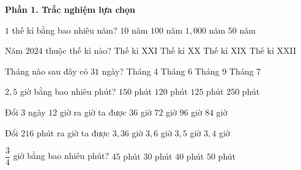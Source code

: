 \textbf{Phần 1. Trắc nghiệm lựa chọn}

\begin{ex} %
$1$ thế kỉ bằng bao nhiêu năm?
\choice
{$10$ năm}
{\True $100$ năm}
{$1,000$ năm}
{$50$ năm}
\end{ex}

\begin{ex} %
Năm $2024$ thuộc thế kỉ nào?
\choice
{\True Thế kỉ XXI}
{Thế kỉ XX}
{Thế kỉ XIX}
{Thế kỉ XXII}
\end{ex}

\begin{ex} %
Tháng nào sau đây có $31$ ngày?
\choice
{Tháng 4}
{Tháng 6}
{Tháng 9}
{\True Tháng 7}
\end{ex}

\begin{ex} %
$2{,}5$ giờ bằng bao nhiêu phút?
\choice
{\True $150$ phút}
{$120$ phút}
{$125$ phút}
{$250$ phút}
\end{ex}

\begin{ex} %
Đổi $3$ ngày $12$ giờ ra giờ ta được
\choice
{$36$ giờ}
{$72$ giờ}
{$96$ giờ}
{\True $84$ giờ}
\end{ex}

\begin{ex} %
Đổi $216$ phút ra giờ ta được
\choice
{$3{,}36$ giờ}
{\True $3{,}6$ giờ}
{$3{,}5$ giờ}
{$3{,}4$ giờ}
\end{ex}

\begin{ex} %
$\dfrac{3}{4}$ giờ bằng bao nhiêu phút?
\choice
{\True $45$ phút}
{$30$ phút}
{$40$ phút}
{$50$ phút}
\end{ex}

